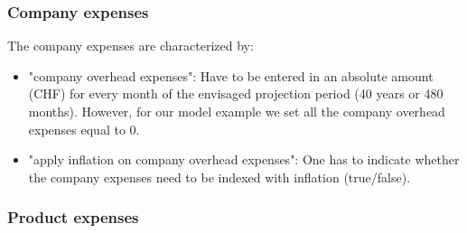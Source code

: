 \subsubsection{Company expenses}

The company expenses are characterized by:

\begin{itemize}
	\item "company overhead expenses": Have to be entered in an absolute amount (CHF) for every month of the envisaged projection period (40 years or 480 months). However, for our model example we set all the company overhead expenses equal to 0.
  \item "apply inflation on company overhead expenses": One has to indicate whether the company expenses need to be indexed with inflation (true/false).
\end{itemize}

\subsubsection{Product expenses}

